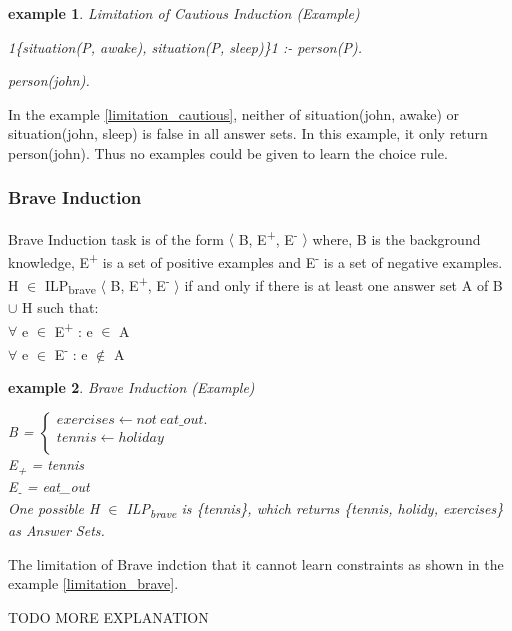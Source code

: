 \documentclass[12pt,twoside]{report}
\newtheorem{examp}{example}[section]
\begin{document}
\begin{examp} \normalfont Limitation of Cautious Induction (Example)

1\{situation(P, awake), situation(P, sleep)\}1 :- person(P).

person(john).

\end{examp}
\label{limitation_cautious}

In the example \ref{limitation_cautious}, neither of situation(john, awake) or situation(john, sleep) is false in all answer sets. In this example, it only return person(john). Thus no examples could be given to learn the choice rule.

\subsubsection{Brave Induction}
Brave Induction task is of the form $\langle$ B, E\textsuperscript{+}, E\textsuperscript{-} $\rangle$ where, B is the background knowledge, E\textsuperscript{+} is a set of positive examples and E\textsuperscript{-} is a set of negative examples.
 H $\in$ ILP\textsubscript{brave} $\langle$ B, E\textsuperscript{+}, E\textsuperscript{-} $\rangle$ if and only if there is at least one answer set A of B $\cup$ H such that: \\
$\forall$ e $\in$ E\textsuperscript{+} : e $\in$ A \\
$\forall$ e $\in$ E\textsuperscript{-} : e $\notin$ A \\

\begin{examp} \normalfont Brave Induction (Example)

B = $\begin{cases}
	exercises  \leftarrow not \ eat\_out. \\
	tennis \leftarrow holiday \\
      \end{cases}$ \\
E\textsubscript{+} = tennis \\
E\textsubscript{-} = eat\_out \\
One possible  H $\in$ ILP\textsubscript{brave} is \{tennis\}, which returns \{tennis, holidy, exercises\} as Answer Sets.
\end{examp}
\label{brave_induction_example}

The limitation of Brave indction that it cannot learn constraints as shown in the example \ref{limitation_brave}.

TODO MORE EXPLANATION
\end{document}
